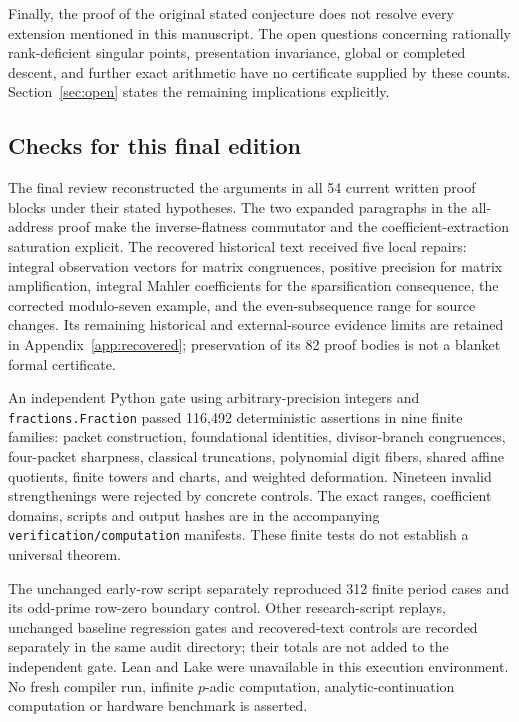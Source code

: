 Finally, the proof of the original stated conjecture does not resolve every
extension mentioned in this manuscript. The open questions concerning
rationally rank-deficient singular points, presentation invariance, global
or completed descent, and further exact arithmetic have no certificate
supplied by these counts. Section~\ref{sec:open} states the remaining implications explicitly.

\subsection{Checks for this final edition}
The final review reconstructed the arguments in all 54 current written
proof blocks under their stated hypotheses. The two expanded paragraphs
in the all-address proof make the inverse-flatness commutator and the
coefficient-extraction saturation explicit. The recovered historical text
received five local repairs: integral observation vectors for matrix
congruences, positive precision for matrix amplification, integral Mahler
coefficients for the sparsification consequence, the corrected modulo-seven
example, and the even-subsequence range for source changes. Its remaining
historical and external-source evidence limits are retained in
Appendix~\ref{app:recovered}; preservation of its 82 proof bodies is not
a blanket formal certificate.

An independent Python gate using arbitrary-precision integers and
\texttt{fractions.Fraction} passed 116,492 deterministic assertions in nine
finite families: packet construction, foundational identities, divisor-branch
congruences, four-packet sharpness, classical truncations, polynomial digit
fibers, shared affine quotients, finite towers and charts, and weighted
deformation. Nineteen invalid strengthenings were rejected by concrete
controls. The exact ranges, coefficient domains, scripts and output hashes
are in the accompanying \nolinkurl{verification/computation} manifests.
These finite tests do not establish a universal theorem.

The unchanged early-row script separately reproduced 312 finite period
cases and its odd-prime row-zero boundary control. Other research-script
replays, unchanged baseline regression gates and recovered-text controls
are recorded separately in the same audit directory; their totals are
not added to the independent gate. Lean and Lake were unavailable in this
execution environment. No fresh compiler run, infinite $p$-adic computation,
analytic-continuation computation or hardware benchmark is asserted.
